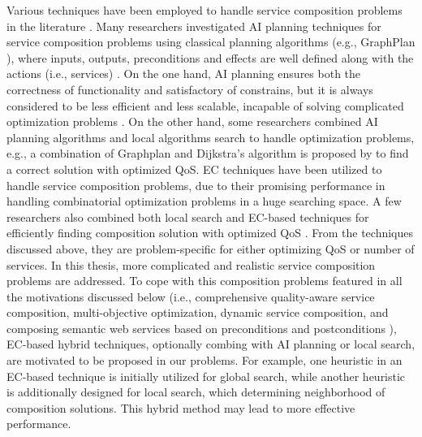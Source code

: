 Various techniques have been employed to handle service composition problems in the literature \cite{feng2013dynamic,markou2015non,parejo2008qos,peer2005web,qi2010combining,wang2014automated}. Many researchers investigated AI planning techniques for service composition problems using classical planning algorithms (e.g., GraphPlan \cite{blum1997fast}), where inputs, outputs, preconditions and effects are well defined along with the actions (i.e., services) \cite{markou2015non,peer2005web}. On the one hand, AI planning ensures both the correctness of functionality and satisfactory of constrains, but it is always considered to be less efficient and less scalable, incapable of solving complicated optimization problems \cite{parejo2008qos}. On the other hand, some researchers combined AI planning algorithms and local algorithms search to handle optimization problems, e.g., a combination of Graphplan and Dijkstra’s algorithm is proposed by \cite{feng2013dynamic} to find a correct solution with optimized QoS. EC techniques have been utilized to handle service composition problems, due to their promising performance in handling combinatorial optimization problems in a huge searching space. A few researchers also combined both local search and EC-based techniques for efficiently finding composition solution with optimized QoS \cite{da2016memetic,parejo2008qos}. From the techniques discussed above, they are problem-specific for either optimizing QoS or number of services. In this thesis, more complicated and realistic service composition problems are addressed. To cope with this composition problems featured in all the motivations discussed below (i.e., comprehensive quality-aware service composition, multi-objective optimization, dynamic service composition, and composing semantic web services based on preconditions and postconditions ), EC-based hybrid techniques, optionally combing with AI planning or local search, are motivated to be proposed in our problems. For example, one heuristic in an EC-based technique is initially utilized for global search, while another heuristic is additionally designed for local search, which determining neighborhood of composition solutions. This hybrid method may lead to more effective performance.

